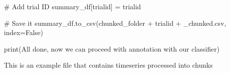 \documentclass[
  letterpaper,
  DIV=11,
  numbers=noendperiod]{scrreprt}
\newenvironment{Shaded}{\begin{snugshade}}{\end{snugshade}}
\newcommand{\BuiltInTok}[1]{\textcolor[rgb]{0.00,0.23,0.31}{#1}}
\newcommand{\CommentTok}[1]{\textcolor[rgb]{0.37,0.37,0.37}{#1}}
\newcommand{\NormalTok}[1]{\textcolor[rgb]{0.00,0.23,0.31}{#1}}
\newcommand{\OperatorTok}[1]{\textcolor[rgb]{0.37,0.37,0.37}{#1}}
\newcommand{\StringTok}[1]{\textcolor[rgb]{0.13,0.47,0.30}{#1}}
\newcommand{\VariableTok}[1]{\textcolor[rgb]{0.07,0.07,0.07}{#1}}
\begin{document}
\begin{Shaded}
\begin{Highlighting}[]
    \CommentTok{\# Add trial ID }
\NormalTok{    summary\_df[}\StringTok{\textquotesingle{}trialid\textquotesingle{}}\NormalTok{] }\OperatorTok{=}\NormalTok{ trialid}

    \CommentTok{\# Save it}
\NormalTok{    summary\_df.to\_csv(chunked\_folder }\OperatorTok{+}\NormalTok{ trialid }\OperatorTok{+} \StringTok{\textquotesingle{}\_chunked.csv\textquotesingle{}}\NormalTok{, index}\OperatorTok{=}\VariableTok{False}\NormalTok{)}

\BuiltInTok{print}\NormalTok{(}\StringTok{\textquotesingle{}All done, now we can proceed with annotation with our classifier\textquotesingle{}}\NormalTok{)}
\end{Highlighting}
\end{Shaded}

This is an example file that contains timeseries processed into chunks
\end{document}
